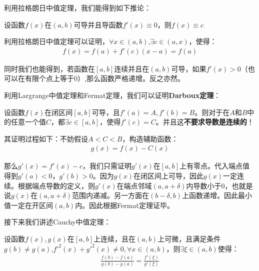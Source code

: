 \documentclass{ctexart}
\let\oldtextbf\textbf %
\renewcommand{\textbf}[1]{\textcolor{btex}{\oldtextbf{#1}}} %
\begin{document}
利用拉格朗日中值定理，我们能得到如下推论：
\begin{tcolorbox}[
    colback=bac2,     %
    colframe=fra2,   %
    coltitle=white,             %
    coltext=tex2,
    title=推论,
    fonttitle=\bfseries,        %
arc=3mm,                     %
breakable
]
设函数$f(x)$在$(a,b)$可导并且导函数$f'(x)\equiv 0$，则$f(x)\equiv c$
\end{tcolorbox}

利用拉格朗日中值定理可以证明，$\forall x\in(a,b)$,$\exists c\in(a,x)$，使得：
\begin{align*}
    f(x)=f(a)+f'(c)(x-a)=f(a)
\end{align*}

同时我们也能得到，若函数在$[a,b]$连续并且在$(a,b)$可导，如果$f'(x)>0$（也可以在有限个点上等于0）,那么函数严格递增。反之亦然。

利用Largrange中值定理和Fermat定理，我们可以证明\textbf{Darboux定理}：
\begin{tcolorbox}[
    colback=bac2,     %
    colframe=fra2,   %
    coltitle=white,             %
    coltext=tex2,
    title=Darboux达布定理,
    fonttitle=\bfseries,        %
arc=3mm,                     %
breakable
]
设函数$f(x)$在闭区间$[a,b]$可导，且$f'(a)=A,f'(b)=B$。则对于在$A$和$B$中的任意一个值$C$，都$\exists c\in[a,b]$，使得$f'(c)=C$。并且这\textbf{不要求导数是连续的}！
\end{tcolorbox}

其证明过程如下：不妨假设$A<C<B$，构造辅助函数：
\begin{align*}
    g(x)=f(x)-C(x)
\end{align*}

那么$g'(x)=f'(x)-c$，我们只需证明$g'(x)$在$[a,b]$上有零点。代入端点值得到$g'(a)<0，g'(b)>0$。因为$g(x)$在闭区间上可导，因此$g(x)$一定连续。根据端点导数的定义，则$g'(x)$在端点邻域$(a,a+\delta)$内导数小于0，也就是说$g(x)$在$(a,a+\delta)$范围内递减。另一方面在$(b-\delta,b)$上函数递增。因此最小值一定在开区间$(a,b)$内。因此根据Fermat定理证毕。

接下来我们讲述Cauchy中值定理：
\begin{tcolorbox}[
    colback=bac1,     %
    colframe=fra1,   %
    coltitle=white,             %
    coltext=tex1,
    title=Cauchy柯西中值定理,
    fonttitle=\bfseries,        %
arc=3mm,                     %
breakable
]

设函数$f(x),g(x)$在$[a,b]$上连续，且在$(a,b)$上可微，且满足条件$g(b)\neq g(a)$,$f'^2(x)+g'^2(x)\neq 0,\forall x\in(a,b)$，则$\exists \xi\in(a,b)$使得：
\begin{align*}
    \frac{f(b)-f(a)}{g(b)-g(a)}=\frac{f'(\xi)}{g'(\xi)}\tag{3-3}
\end{align*}
\end{tcolorbox}
\end{document}
